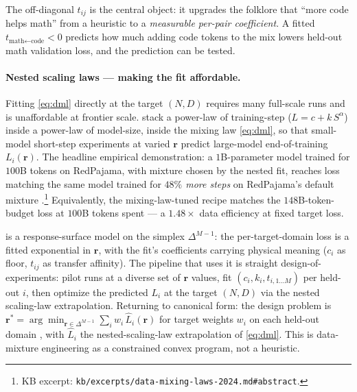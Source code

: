 The off-diagonal $t_{ij}$ is the central object: it upgrades the
folklore that ``more code helps math'' from a heuristic to a
\emph{measurable per-pair coefficient}. A fitted
$t_{\text{math} \leftarrow \text{code}} < 0$ predicts how much
adding code tokens to the mix lowers held-out math validation loss,
and the prediction can be tested.

\paragraph{Nested scaling laws --- making the fit affordable.}
Fitting \cref{eq:dml} directly at the target $(N, D)$ requires
many full-scale runs and is unaffordable at frontier scale.
\citet[\S 1, \S 2]{data-mixing-laws-2024} stack a power-law of
training-step ($L = c + k\,S^{\alpha}$) inside a power-law of
model-size, inside the mixing law \cref{eq:dml}, so that small-model
short-step experiments at varied $\mathbf{r}$ predict large-model
end-of-training $L_i(\mathbf{r})$. The headline empirical
demonstration: a $1$B-parameter model trained for $100$B tokens on
RedPajama, with mixture chosen by the nested fit, reaches loss
matching the same model trained for \emph{$48\%$ more steps} on
RedPajama's default mixture
\citep[abstract]{data-mixing-laws-2024}.\footnote{KB excerpt:
\nolinkurl{kb/excerpts/data-mixing-laws-2024.md#abstract}.} Equivalently,
the mixing-law-tuned recipe matches the $148$B-token-budget loss at
$100$B tokens spent --- a $1.48\times$ data efficiency at fixed
target loss.

\begin{analogy}
\label{analogy:dml-as-response-surface}
 is a response-surface model on the simplex
$\Delta^{M-1}$: the per-target-domain loss is a fitted exponential
in $\mathbf{r}$, with the fit's coefficients carrying physical
meaning ($c_i$ as floor, $t_{ij}$ as transfer affinity). The pipeline
that uses it is straight design-of-experiments: pilot runs at a
diverse set of $\mathbf{r}$ values, fit $(c_i, k_i, t_{i, 1\ldots
M})$ per held-out $i$, then optimize the predicted $L_i$ at the
target $(N, D)$ via the nested scaling-law extrapolation. Returning
to canonical form: the design problem is
$\mathbf{r}^* = \arg\min_{\mathbf{r} \in \Delta^{M-1}}
\sum_i w_i\,\hat{L}_i(\mathbf{r})$ for target weights $w_i$ on each
held-out domain \citep[\S 2, eq.\ 5]{data-mixing-laws-2024}, with
$\hat{L}_i$ the nested-scaling-law extrapolation of \cref{eq:dml}.
This is data-mixture engineering as a constrained convex program,
not a heuristic.
\end{analogy}

